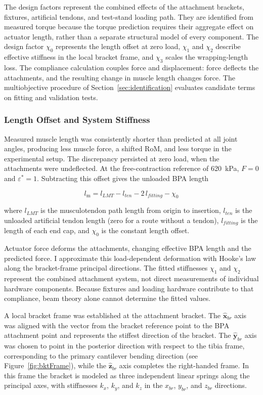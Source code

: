 The design factors represent the combined effects of the attachment brackets, fixtures, artificial tendons, and test-stand loading path. They are identified from measured torque because the torque prediction requires their aggregate effect on actuator length, rather than a separate structural model of every component. The design factor $\chi_0$ represents the length offset at zero load, $\chi_1$ and $\chi_2$ describe effective stiffness in the local bracket frame, and $\chi_3$ scales the wrapping-length loss. The compliance calculation couples force and displacement: force deflects the attachments, and the resulting change in muscle length changes force. The multiobjective procedure of Section~\ref{sec:identification} evaluates candidate terms on fitting and validation tests.

\subsubsection{Length Offset and System Stiffness}\label{sec:offset_stiffness}

Measured muscle length was consistently shorter than predicted at all joint angles, producing less muscle force, a shifted RoM, and less torque in the experimental setup. The discrepancy persisted at zero load, when the attachments were undeflected. At the free-contraction reference of \qty{620}{\kPa}, $F=0$ and $\varepsilon^{*}=1$. Subtracting this offset gives the unloaded BPA length

\begin{equation}
    l_\text{m} = l_{LMT} - l_{ten} - 2\,l_{fitting} - \chi_{0} 
    \label{eq:Lm}
\end{equation}

where $l_{LMT}$ is the musculotendon path length from origin to insertion, $l_{ten}$ is the unloaded artificial tendon length (zero for a route without a tendon), $l_{fitting}$ is the length of each end cap, and $\chi_{0}$ is the constant length offset. 

Actuator force deforms the attachments, changing effective BPA length and the predicted force. I approximate this load-dependent deformation with Hooke's law along the bracket-frame principal directions. The fitted stiffnesses $\chi_1$ and $\chi_2$ represent the combined attachment system, not direct measurements of individual hardware components. Because fixtures and loading hardware contribute to that compliance, beam theory alone cannot determine the fitted values.

A local bracket frame was established at the attachment bracket. The $\hat{\mathbf{x}}_{br}$ axis was aligned with the vector from the bracket reference point to the BPA attachment point and represents the stiffest direction of the bracket. The $\hat{\mathbf{y}}_{br}$ axis was chosen to point in the posterior direction with respect to the tibia frame, corresponding to the primary cantilever bending direction (see Figure~\ref{fig:bktFrame}), while the $\hat{\mathbf{z}}_{br}$ axis completes the right-handed frame. In this frame the bracket is modeled as three independent linear springs along the principal axes, with stiffnesses $k_{x}$, $k_{y}$, and $k_{z}$ in the $x_{br}$, $y_{br}$, and $z_{br}$ directions.

